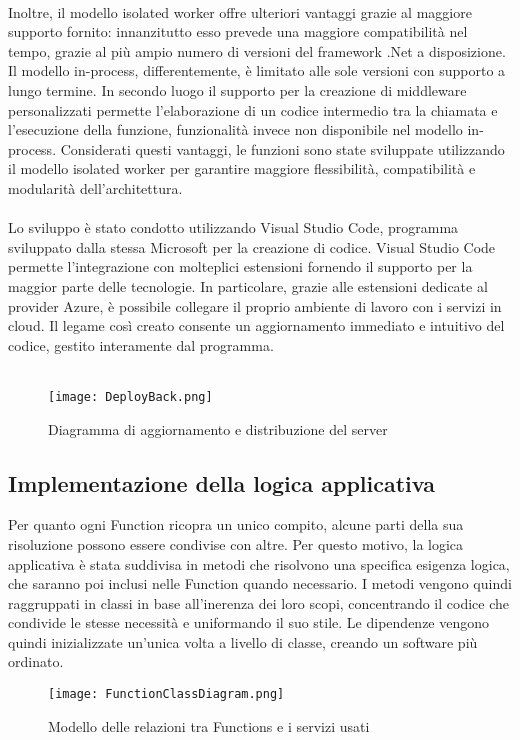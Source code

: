 \\
Inoltre, il modello isolated worker offre ulteriori vantaggi grazie al maggiore supporto fornito:
innanzitutto esso prevede una maggiore compatibilità nel tempo,
grazie al più ampio numero di versioni del framework .Net a disposizione.
Il modello in-process, differentemente, è limitato alle sole versioni con supporto a lungo termine.
In secondo luogo il supporto per la creazione di middleware personalizzati
permette l'elaborazione di un codice intermedio tra la chiamata e l’esecuzione della funzione,
funzionalità invece non disponibile nel modello in-process.
Considerati questi vantaggi, le funzioni sono state sviluppate utilizzando il modello isolated worker
per garantire maggiore flessibilità, compatibilità e modularità dell’architettura.\\
\\
Lo sviluppo è stato condotto utilizzando Visual Studio Code,
programma sviluppato dalla stessa Microsoft per la creazione di codice.
Visual Studio Code permette l'integrazione con molteplici estensioni fornendo il supporto
per la maggior parte delle tecnologie.
In particolare, grazie alle estensioni dedicate al provider Azure,
è possibile collegare il proprio ambiente di lavoro con i servizi in cloud.
Il legame così creato consente un aggiornamento immediato e intuitivo del codice,
gestito interamente dal programma.\\
\\
\begin{figure}[h!]
    \begin{center}
        \texttt{[image: DeployBack.png]}
        \caption{Diagramma di aggiornamento e distribuzione del server}
    \end{center}
\end{figure}

\clearpage


\subsection{Implementazione della logica applicativa}
Per quanto ogni Function ricopra un unico compito,
alcune parti della sua risoluzione possono essere condivise con altre.
Per questo motivo,
la logica applicativa è stata suddivisa in metodi che risolvono una specifica esigenza logica,
che saranno poi inclusi nelle Function quando necessario.
I metodi vengono quindi raggruppati in classi in base all'inerenza dei loro scopi,
concentrando il codice che condivide le stesse necessità e uniformando il suo stile.
Le dipendenze vengono quindi inizializzate un'unica volta a livello di classe,
creando un software più ordinato.\\
\begin{figure}[h!]
    \begin{center}
        \texttt{[image: FunctionClassDiagram.png]}
        \caption{Modello delle relazioni tra Functions e i servizi usati}
    \end{center}
\end{figure}

